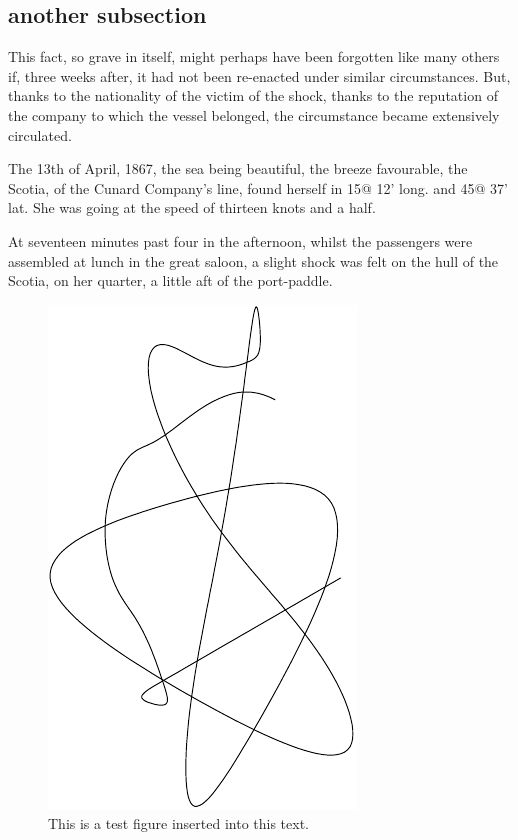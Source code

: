 \subsection{another subsection}

This fact, so grave in itself, might perhaps have been forgotten
like many others if, three weeks after, it had not been re-enacted
under similar circumstances.  But, thanks to the nationality of
the victim of the shock, thanks to the reputation of the company to
which the vessel belonged, the circumstance became extensively circulated.

The 13th of April, 1867, the sea being beautiful, the breeze favourable,
the Scotia, of the Cunard Company's line, found herself in 15@ 12' long.
and 45@ 37' lat.  She was going at the speed of thirteen knots and a half.

At seventeen minutes past four in the afternoon, whilst the passengers were
assembled at lunch in the great saloon, a slight shock was felt on the hull
of the Scotia, on her quarter, a little aft of the port-paddle.

\begin{figure}%
  \centering
  \includegraphics[width=100bp]{jules-verne-test}%
  \caption[A test figure. This is a test figure inserted into this text.  This is a test figure inserted into this text.  This is a test figure inserted into this text.]
  {This is a test figure inserted into this text.}%
  \label{fig:test1}%
\end{figure}


